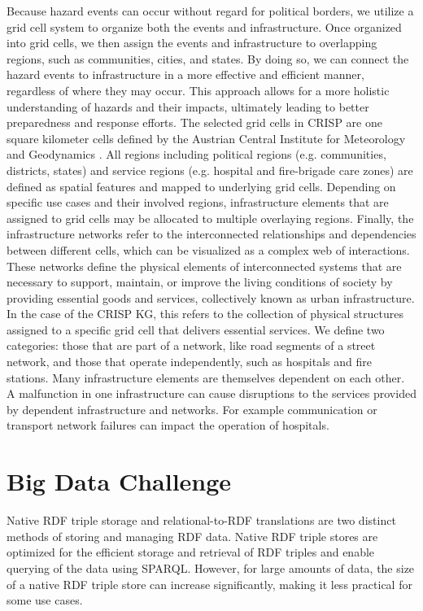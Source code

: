 \documentclass[
]{ceurart}
\begin{document}
Because hazard events can occur without regard for political borders, we utilize a grid cell system to organize both the events and infrastructure. Once organized into grid cells, we then assign the events and infrastructure to overlapping regions, such as communities, cities, and states. By doing so, we can connect the hazard events to infrastructure in a more effective and efficient manner, regardless of where they may occur. This approach allows for a more holistic understanding of hazards and their impacts, ultimately leading to better preparedness and response efforts. The selected grid cells in CRISP are one square kilometer cells defined by the Austrian Central Institute for Meteorology and Geodynamics \cite{haiden2011integrated}. 
All regions including political regions (e.g. communities, districts, states) and service regions (e.g. hospital and fire-brigade care zones) are defined as spatial features and mapped to underlying grid cells. Depending on specific use cases and their involved regions, infrastructure elements that are assigned to grid cells may be allocated to multiple overlaying regions. 
Finally, the infrastructure networks refer to the interconnected relationships and dependencies between different cells, which can be visualized as a complex web of interactions. These networks define the physical elements of interconnected systems that are necessary to support, maintain, or improve the living conditions of society by providing essential goods and services, collectively known as urban infrastructure. In the case of the CRISP KG, this refers to the collection of physical structures assigned to a specific grid cell that delivers essential services. We define two categories: those that are part of a network, like road segments of a street network, and those that operate independently, such as hospitals and fire stations. Many infrastructure elements are themselves dependent on each other. A malfunction in one infrastructure can cause disruptions to the services provided by dependent infrastructure and networks. For example communication or transport network failures can impact the operation of hospitals.





\section{Big Data Challenge}


Native RDF triple storage and relational-to-RDF translations are two distinct methods of storing and managing RDF data. Native RDF triple stores are optimized for the efficient storage and retrieval of RDF triples and enable querying of the data using SPARQL. However, for large amounts of data, the size of a native RDF triple store can increase significantly, making it less practical for some use cases. 
\end{document}
